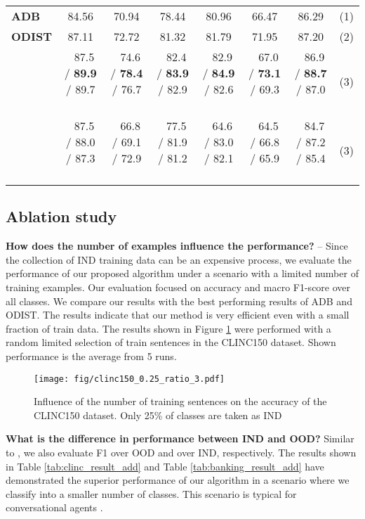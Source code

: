 \documentclass[runningheads]{llncs}
\begin{document}
\begin{table}[t]
\begin{adjustbox}{width=1\textwidth}
\begin{tabular}{l|cc|cc|cc|c}
\textbf{ADB}                & 84.56                & 70.94                & 78.44                & 80.96                & 66.47                & 86.29                & (1)  \\
\textbf{ODIST}              & 87.11                & 72.72                & 81.32       & 81.79                & 71.95       & 87.20                & (2)  \\ \hline
    & \,\, 87.5 /  \textbf{89.9} /  89.7 \,\, & \,\, 74.6 /  \textbf{78.4} /  76.7 \,\, & \,\, 82.4 /  \textbf{83.9} /  82.9 \,\, & \,\, 82.9 /  \textbf{84.9} /  82.6 \,\, & \,\, 67.0 /  \textbf{73.1} /  69.3 \,\, & \,\, 86.9 /  \textbf{88.7} /  87.0 \,\, & (3)  \\
 & \,\, 87.5 /  88.0 /  87.3 \,\, & \,\, 66.8 /  69.1 /  72.9 \,\, & \,\, 77.5 /  81.9 /  81.2 \,\, & \,\, 64.6 /  83.0 /  82.1 \,\, & \,\, 64.5 /  66.8 /  65.9 \,\, & \,\, 84.7 /  87.2 /  85.4 \,\, & (3) 
\end{tabular}
\end{adjustbox}

\end{table}

\subsection{Ablation study}

\textbf{How does the number of examples influence the performance?} -- Since the collection of IND training data can be an expensive process, we evaluate the performance of our proposed algorithm under a scenario with a limited number of training examples. Our evaluation focused on accuracy and macro F1-score over all classes. We compare our results with the best performing results of ADB and ODIST. The results indicate that our method is very efficient even with a small fraction of train data. The results shown in Figure \ref{fig:num_train_examples} were performed with a random limited selection of train sentences in the CLINC150 dataset. Shown performance is the average from 5 runs.

\begin{figure}[]
\centering
\texttt{[image: fig/clinc150\_0.25\_ratio\_3.pdf]}
\caption{Influence of the number of training sentences on the accuracy of the CLINC150 dataset. Only 25\% of classes are taken as IND}
\label{fig:num_train_examples}

\end{figure}


\textbf{What is the difference in performance between IND and OOD?} Similar to \cite{zhang2021adaptive_decision_boundary}, we also evaluate F1 over OOD and over IND, respectively. The results shown in Table \ref{tab:clinc_result_add} and Table \ref{tab:banking_result_add} have demonstrated the superior performance of our algorithm in a scenario where we classify into a smaller number of classes. This scenario is typical for conversational agents \cite{konrad2021alquist4}.
\end{document}
